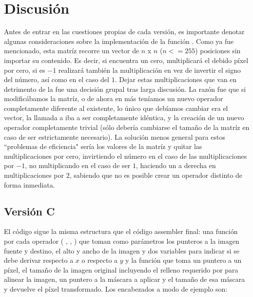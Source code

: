 \section{Discusi\'on}

Antes de entrar en las cuestiones propias de cada versi\'on, es importante denotar algunas consideraciones sobre la 
implementaci\'on de la funci\'on . Como ya fue mencionado, esta matr\'iz recorre un vector de $n$ x $n$ 
($n<=255$) posiciones sin importar su contenido. Es decir, si encuentra un cero, multiplicar\'a el debido p\'ixel por 
cero, si es $-1$ realizar\'a tambi\'en la multiplicaci\'on en vez de invertir el signo del n\'umero, as\'i como en el caso 
del $1$. Dejar estas multiplicaciones que van en detrimento de la  fue una decisi\'on grupal 
tras larga discusi\'on. La raz\'on fue que si modific\'abamos la matr\'iz, o de ahora en m\'as ten\'iamos un nuevo operador 
completamente diferente al existente, lo \'unico que deb\'iamos cambiar era el vector, la llamada a  
iba a ser completamente id\'entica, y la creaci\'on de un nuevo operador completamente trivial (s\'olo deber\'ia cambiarse 
el tama\~no de la matr\'iz en caso de ser estrictamente necesario). La soluci\'on menos general para estos ``problemas de
eficiencia" ser\'ia  los valores de la matr\'iz y quitar las multiplicaciones por cero, 
invirtiendo el n\'umero en el caso de las multiplicaciones por $-1$, no multiplicando en el caso de ser $1$, 
haciendo un  a derecha en multiplicaciones por $2$, sabiendo que no es posible crear un operador 
distinto de forma inmediata.

\subsection{Versi\'on C}

El c\'odigo sigue la misma estructura que el c\'odigo assembler final: una funci\'on por cada operador ( , 
,  ) que toman como par\'ametros los punteros a la imagen fuente y destino, el alto y 
ancho de la imagen y dos variables para indicar si se debe derivar respecto a $x$ o respecto a $y$ y la funci\'on 
 que toma un puntero a un p\'ixel, el tama\~no de la imagen original incluyendo el relleno requerido 
por  para alinear la imagen, un puntero a la m\'ascara a aplicar y el tama\~no de esa m\'ascara y devuelve 
el p\'ixel transformado. Los encabezados a modo de ejemplo son:\\

